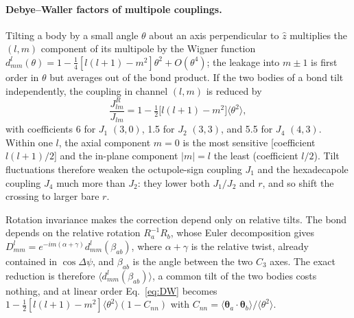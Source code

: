\documentclass[pre,reprint,superscriptaddress,longbibliography,amsmath,amssymb,floatfix]{revtex4-2}
\begin{document}
\paragraph*{Debye--Waller factors of multipole couplings.} Tilting a body by a small angle $\theta$ about an axis perpendicular to $\hat z$ multiplies the $(l,m)$ component of its multipole by the Wigner function $d^l_{mm}(\theta)=1-\frac14[l(l+1)-m^2]\theta^2+O(\theta^4)$; the leakage into $m\pm1$ is first order in $\theta$ but averages out of the bond product. If the two bodies of a bond tilt independently, the coupling in channel $(l,m)$ is reduced by
\begin{equation}
\frac{J^R_{lm}}{J_{lm}}=1-\tfrac12\big[l(l+1)-m^2\big]\langle\theta^2\rangle ,
\label{eq:DW}
\end{equation}
with coefficients 6 for $J_1$ $(3,0)$, 1.5 for $J_2$ $(3,3)$, and 5.5 for $J_4$ $(4,3)$. Within one $l$, the axial component $m=0$ is the most sensitive [coefficient $l(l+1)/2$] and the in-plane component $|m|=l$ the least (coefficient $l/2$). Tilt fluctuations therefore weaken the octupole-sign coupling $J_1$ and the hexadecapole coupling $J_4$ much more than $J_2$: they lower both $J_1/J_2$ and $r$, and so shift the crossing to larger bare $r$.

Rotation invariance makes the correction depend only on relative tilts. The bond depends on the relative rotation $R_a^{-1}R_b$, whose Euler decomposition gives $D^l_{mm}=e^{-im(\alpha+\gamma)}d^l_{mm}(\beta_{ab})$, where $\alpha+\gamma$ is the relative twist, already contained in $\cos\Delta\psi$, and $\beta_{ab}$ is the angle between the two $C_3$ axes. The exact reduction is therefore $\langle d^l_{mm}(\beta_{ab})\rangle$, a common tilt of the two bodies costs nothing, and at linear order Eq.~\eqref{eq:DW} becomes $1-\frac12[l(l+1)-m^2]\langle\theta^2\rangle(1-C_{nn})$ with $C_{nn}=\langle\bm\theta_a\cdot\bm\theta_b\rangle/\langle\theta^2\rangle$.
\end{document}

